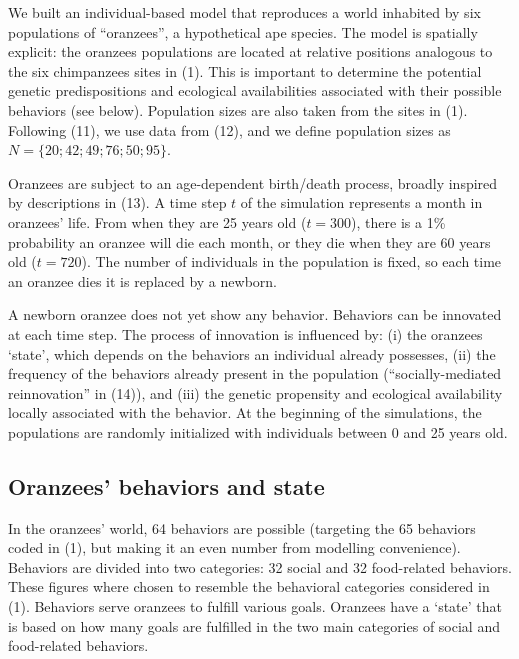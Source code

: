 \documentclass[9pt,twocolumn,twoside,]{pnas-new}
\begin{document}
We built an individual-based model that reproduces a world inhabited by
six populations of ``oranzees'', a hypothetical ape species. The model
is spatially explicit: the oranzees populations are located at relative
positions analogous to the six chimpanzees sites in (1). This is
important to determine the potential genetic predispositions and
ecological availabilities associated with their possible behaviors (see
below). Population sizes are also taken from the sites in (1). Following
(11), we use data from (12), and we define population sizes as
\(N=\{20;42;49;76;50;95\}\).

Oranzees are subject to an age-dependent birth/death process, broadly
inspired by descriptions in (13). A time step \(t\) of the simulation
represents a month in oranzees' life. From when they are 25 years old
(\(t=300\)), there is a 1\% probability an oranzee will die each month,
or they die when they are 60 years old (\(t=720\)). The number of
individuals in the population is fixed, so each time an oranzee dies it
is replaced by a newborn.

A newborn oranzee does not yet show any behavior. Behaviors can be
innovated at each time step. The process of innovation is influenced by:
(i) the oranzees `state', which depends on the behaviors an individual
already possesses, (ii) the frequency of the behaviors already present
in the population (``socially-mediated reinnovation'' in (14)), and
(iii) the genetic propensity and ecological availability locally
associated with the behavior. At the beginning of the simulations, the
populations are randomly initialized with individuals between 0 and 25
years old.

\subsection*{Oranzees' behaviors and state}\label{format}

In the oranzees' world, 64 behaviors are possible (targeting the 65
behaviors coded in (1), but making it an even number from modelling
convenience). Behaviors are divided into two categories: 32 social and
32 food-related behaviors. These figures where chosen to resemble the
behavioral categories considered in (1). Behaviors serve oranzees to
fulfill various goals. Oranzees have a `state' that is based on how many
goals are fulfilled in the two main categories of social and
food-related behaviors.
\end{document}
